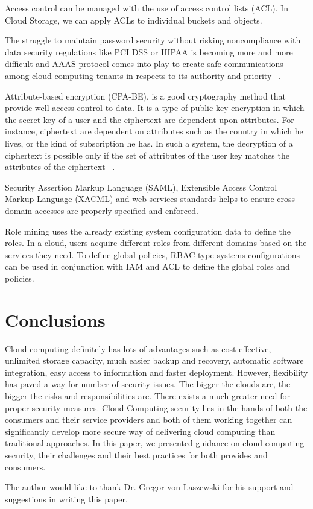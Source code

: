 Access control can be managed with the use of access control lists (ACL).
In Cloud Storage, we can apply ACLs to individual buckets and objects.

The struggle to maintain password security without risking noncompliance
with data security regulations like PCI DSS or HIPAA is becoming more and
more difficult and AAAS protocol comes into play to create safe 
communications among cloud computing tenants in respects to its authority
and priority ~\cite{hid-sp18-513-poland}. 

Attribute-based encryption (CPA-BE), is a good cryptography 
method that provide well access control to data. It is a type of public-key 
encryption in which the secret key of a user and the ciphertext are 
dependent upon attributes. For instance, ciphertext are dependent on attributes 
such as the country in which he lives, or the kind of subscription he has.
In such a system, the decryption of a ciphertext is possible only if the set 
of attributes of the user key matches the attributes of the ciphertext ~\cite{hid-sp18-513-poland}.

Security Assertion Markup Language (SAML), Extensible Access Control Markup Language
(XACML) and web services standards helps to ensure cross-domain accesses are
properly specified and enforced.

Role mining uses the already existing system configuration data to define the roles. 
In a cloud, users acquire different roles from different domains based on the 
services they need. To define global policies, RBAC type systems configurations 
can be used in conjunction with IAM and ACL to define the global roles and 
policies.

\section{Conclusions}
Cloud computing definitely has lots of advantages such as cost effective, 
unlimited storage capacity, much easier backup and recovery, automatic
software integration, easy access to information and faster deployment. 
However, flexibility has paved a way for number of security issues.
The bigger the clouds are, the bigger the risks and responsibilities are. 
There exists a much greater need for proper security measures.
Cloud Computing security lies in the hands of both the consumers and their
service providers and both of them working together can significantly 
develop more secure way of delivering cloud computing than traditional 
approaches. In this paper, we presented guidance on cloud computing security,
their challenges and their best practices for both provides and consumers.

\begin{acks}
The author would like to thank Dr. Gregor von Laszewski for his support and 
suggestions in writing this paper.
\end{acks}
